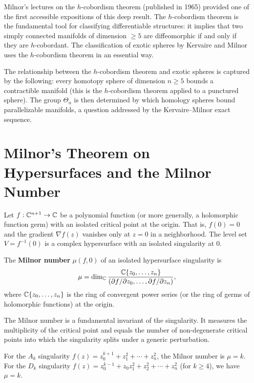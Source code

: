 Milnor's lectures on the \(h\)-cobordism theorem (published in 1965) provided one of the first accessible expositions of this deep result. The \(h\)-cobordism theorem is the fundamental tool for classifying differentiable structures: it implies that two simply connected manifolds of dimension \(\geq 5\) are diffeomorphic if and only if they are \(h\)-cobordant. The classification of exotic spheres by Kervaire and Milnor uses the \(h\)-cobordism theorem in an essential way.

The relationship between the \(h\)-cobordism theorem and exotic spheres is captured by the following: every homotopy sphere of dimension \(n \geq 5\) bounds a contractible manifold (this is the \(h\)-cobordism theorem applied to a punctured sphere). The group \(\Theta_n\) is then determined by which homology spheres bound parallelizable manifolds, a question addressed by the Kervaire--Milnor exact sequence.

\section{Milnor's Theorem on Hypersurfaces and the Milnor Number}

Let \(f: \mathbb{C}^{n+1} \to \mathbb{C}\) be a polynomial function (or more generally, a holomorphic function germ) with an isolated critical point at the origin. That is, \(f(0) = 0\) and the gradient \(\nabla f(z)\) vanishes only at \(z = 0\) in a neighborhood. The level set \(V = f^{-1}(0)\) is a complex hypersurface with an isolated singularity at 0.

\begin{definition}
The \textbf{Milnor number} \(\mu(f,0)\) of an isolated hypersurface singularity is
\[
\mu = \dim_{\mathbb{C}} \frac{\mathbb{C}\{z_0,\dots,z_n\}}{(\partial f/\partial z_0, \dots, \partial f/\partial z_n)},
\]
where \(\mathbb{C}\{z_0,\dots,z_n\}\) is the ring of convergent power series (or the ring of germs of holomorphic functions) at the origin.
\end{definition}

The Milnor number is a fundamental invariant of the singularity. It measures the multiplicity of the critical point and equals the number of non-degenerate critical points into which the singularity splits under a generic perturbation.

\begin{example}
For the \(A_k\) singularity \(f(z) = z_0^{k+1} + z_1^2 + \cdots + z_n^2\), the Milnor number is \(\mu = k\). For the \(D_k\) singularity \(f(z) = z_0^{k-1} + z_0 z_1^2 + z_2^2 + \cdots + z_n^2\) (for \(k \geq 4\)), we have \(\mu = k\).
\end{example}

